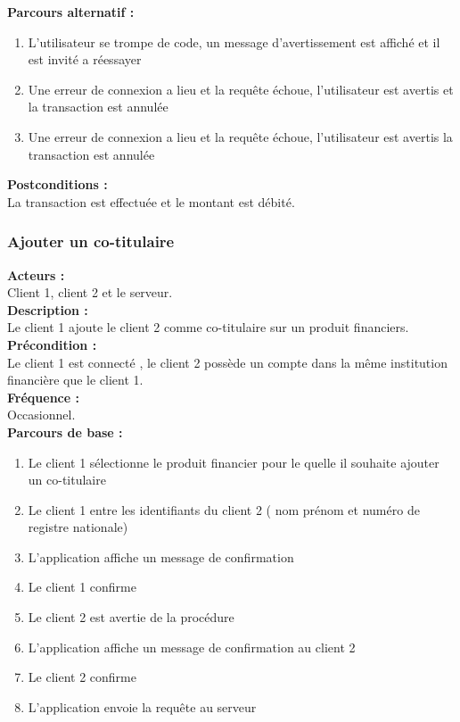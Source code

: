 \documentclass[../rapport.tex]{subfiles}
\begin{document}
\textbf{Parcours alternatif :}
\begin{enumerate}
    \item L’utilisateur se trompe de code, un message d’avertissement est affiché et il est invité a réessayer
    \item Une erreur de connexion a lieu et la requête échoue, l’utilisateur est avertis et la transaction est annulée
    \item Une erreur de connexion a lieu et la requête échoue, l’utilisateur est avertis la transaction est annulée
\end{enumerate}

\textbf{Postconditions :} \\
La transaction est effectuée et le montant est débité. \\



\subsubsection{Ajouter un co-titulaire}

\textbf{Acteurs :} \\
Client 1, client 2 et le serveur. \\

\textbf{Description :} \\
Le client 1 ajoute le client 2 comme co-titulaire sur un produit financiers. \\

\textbf{Précondition :} \\
Le client 1 est connecté , le client 2 possède un compte dans la même institution financière que le client 1. \\

\textbf{Fréquence :} \\
Occasionnel. \\

\textbf{Parcours de base :} \\
\begin{enumerate}
    \item Le client 1 sélectionne le produit financier pour le quelle il souhaite ajouter un co-titulaire
    \item Le client 1 entre les identifiants du client 2 ( nom prénom et numéro de registre nationale)
    \item L’application affiche un message de confirmation
    \item Le client 1 confirme
    \item Le client 2 est avertie de la procédure
    \item L’application affiche un message de confirmation au client 2
    \item Le client 2 confirme
    \item L’application envoie la requête au serveur
\end{enumerate}
\bigskip
\end{document}
